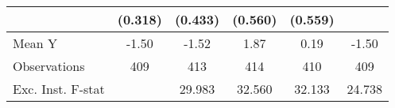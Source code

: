 {\begin{tabular}{l*{5}{c}}
            &     (0.318)         &     (0.433)         &     (0.560)         &     (0.559)         &                     \\
\midrule
Mean Y      &       -1.50         &       -1.52         &        1.87         &        0.19         &       -1.50         \\
Observations&         409         &         413         &         414         &         410         &         409         \\
Exc. Inst. F-stat&                     &      29.983         &      32.560         &      32.133         &      24.738         \\
\bottomrule
\end{tabular}
}
